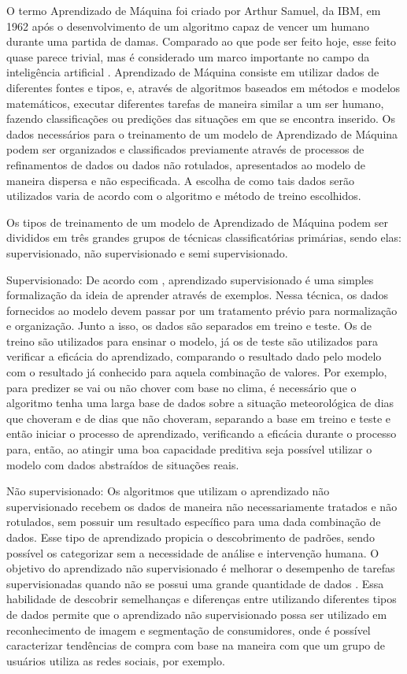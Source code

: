 O termo Aprendizado de Máquina foi criado por Arthur Samuel, da IBM,
em 1962 após o desenvolvimento de um algoritmo capaz de vencer um
humano durante uma partida de damas. Comparado ao que pode ser feito
hoje, esse feito quase parece trivial, mas é considerado um marco
importante no campo da inteligência artificial \cite{ibm2022}.
Aprendizado de Máquina consiste em utilizar dados de diferentes fontes
e tipos, e, através de algoritmos baseados em métodos e modelos
matemáticos, executar diferentes tarefas de maneira similar a um ser
humano, fazendo classificações ou predições das situações em que se
encontra inserido.  Os dados necessários para o treinamento de um
modelo de Aprendizado de Máquina podem ser organizados e classificados
previamente através de processos de refinamentos de dados ou dados não
rotulados, apresentados ao modelo de maneira dispersa e não
especificada. A escolha de como tais dados serão utilizados varia de
acordo com o algoritmo e método de treino escolhidos.

Os tipos de treinamento de um modelo de Aprendizado de Máquina podem
ser divididos em três grandes grupos de técnicas classificatórias
primárias, sendo elas: supervisionado, não supervisionado e semi
supervisionado.

Supervisionado: De acordo com , aprendizado
supervisionado é uma simples formalização da ideia de aprender através
de exemplos. Nessa técnica, os dados fornecidos ao modelo devem passar
por um tratamento prévio para normalização e organização. Junto a
isso, os dados são separados em treino e teste. Os de treino são
utilizados para ensinar o modelo, já os de teste são utilizados para
verificar a eficácia do aprendizado, comparando o resultado dado pelo
modelo com o resultado já conhecido para aquela combinação de
valores. Por exemplo, para predizer se vai ou não chover com base no
clima, é necessário que o algoritmo tenha uma larga base de dados
sobre a situação meteorológica de dias que choveram e de dias que não
choveram, separando a base em treino e teste e então iniciar o
processo de aprendizado, verificando a eficácia durante o processo
para, então, ao atingir uma boa capacidade preditiva seja possível
utilizar o modelo com dados abstraídos de situações reais.

Não supervisionado: Os algoritmos que utilizam o aprendizado não
supervisionado recebem os dados de maneira não necessariamente
tratados e não rotulados, sem possuir um resultado específico para uma
dada combinação de dados. Esse tipo de aprendizado propicia o
descobrimento de padrões, sendo possível os categorizar sem a
necessidade de análise e intervenção humana. O objetivo do aprendizado
não supervisionado é melhorar o desempenho de tarefas supervisionadas
quando não se possui uma grande quantidade de dados
\cite{sutskever2015}. Essa habilidade de descobrir semelhanças e
diferenças entre utilizando diferentes tipos de dados permite que o
aprendizado não supervisionado possa ser utilizado em reconhecimento
de imagem e segmentação de consumidores, onde é possível caracterizar
tendências de compra com base na maneira com que um grupo de usuários
utiliza as redes sociais, por exemplo.

